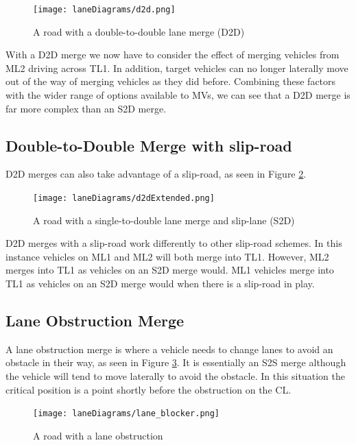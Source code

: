 \begin{figure}[htb]
\texttt{[image: laneDiagrams/d2d.png]}
\caption{A road with a double-to-double lane merge (D2D)}
\label{fig:D2DMerge}
\end{figure}

With a D2D merge we now have to consider the effect of merging vehicles from ML2 driving across TL1. In addition, target vehicles can no longer laterally move out of the way of merging vehicles as they did before. Combining these factors with the wider range of options available to MVs, we can see that a D2D merge is far more complex than an S2D merge.

\subsection{Double-to-Double Merge with slip-road}
\label{subsec:Double-to-Double Merge with slip-road}

D2D merges can also take advantage of a slip-road, as seen in Figure \ref{fig:D2DMergeExtended}.

\begin{figure}[htb]
\texttt{[image: laneDiagrams/d2dExtended.png]}
\caption{A road with a single-to-double lane merge and slip-lane (S2D)}
\label{fig:D2DMergeExtended}
\end{figure}

D2D merges with a slip-road work differently to other slip-road schemes. In this instance vehicles on ML1 and ML2 will both merge into TL1. However, ML2 merges into TL1 as vehicles on an S2D merge would. ML1 vehicles merge into TL1 as vehicles on an S2D merge would when there is a slip-road in play.

\subsection{Lane Obstruction Merge}
\label{subsec:Lane Obstruction Merge}
A lane obstruction merge is where a vehicle needs to change lanes to avoid an obstacle in their way, as seen in Figure \ref{fig:LaneObstruction}. It is essentially an S2S merge although the vehicle will tend to move laterally to avoid the obstacle. In this situation the critical position is a point shortly before the obstruction on the CL. 

\begin{figure}[htb]
\texttt{[image: laneDiagrams/lane\_blocker.png]}
\caption{A road with a lane obstruction}
\label{fig:LaneObstruction}
\end{figure}

